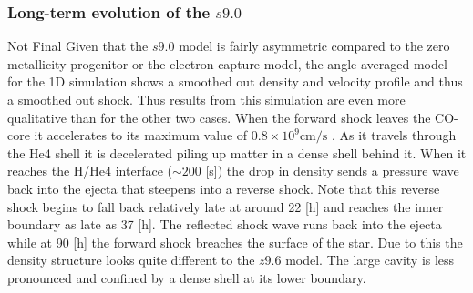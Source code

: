 \documentclass[fleqn,usenatbib]{mnras}
\newcommand{\COM}[1]{{\color{orange}#1}}
\begin{document}
\subsubsection{Long-term evolution of the $s9.0$}
\label{sec:Long term evolution of the s9.0 model}
\COM{Not Final}
Given that the $s9.0$ model is fairly asymmetric compared to the zero metallicity progenitor or the electron capture model, the angle averaged model for the 1D simulation shows a smoothed out density and velocity profile and thus a smoothed out shock. Thus results from this simulation are even more qualitative than for the other two cases.
When the forward shock leaves the CO-core it accelerates to its maximum value of $0.8\times 10^{9}\mathrm{cm/s}$ . As it travels through the He4 shell it is decelerated piling up matter in a dense shell behind it. When it reaches the H/He4 interface ($\sim 200$ [s]) the drop in density sends a pressure wave back into the ejecta that steepens into a reverse shock. Note that this reverse shock begins to fall back relatively late at around 22 [h] and reaches the inner boundary as late as 37 [h]. The reflected shock wave runs back into the ejecta while at 90 [h] the forward shock breaches the surface of the star. Due to this the density structure looks quite different to the $z9.6$ model. The large cavity is less pronounced and confined by a dense shell at its lower boundary. 
\end{document}
